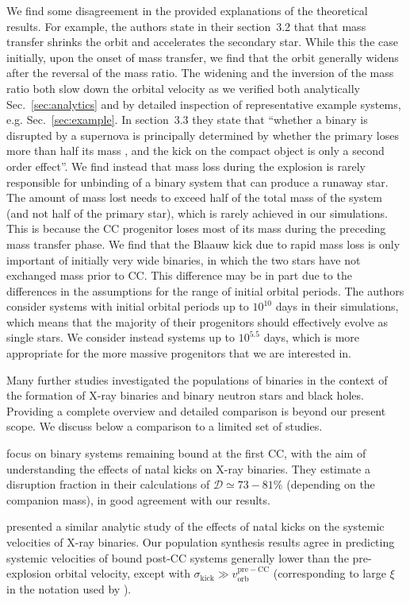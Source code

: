 \documentclass{aa}
\DeclareRobustCommand{\Secref}[1]{Sec.~\ref{#1}}
\begin{document}
We find some disagreement in the provided explanations of the
theoretical results.  For example, the authors state in their
section~3.2 that that mass transfer shrinks the orbit and accelerates
the secondary star. While this the case initially, upon the onset of
mass transfer, we find that the orbit generally widens after the
reversal of the mass ratio. The widening and the inversion of the mass
ratio both slow down the orbital velocity as we verified both
analytically \Secref{sec:analytics} and by detailed inspection of
representative example systems, e.g. \Secref{sec:example}.  In
section~3.3 they state that  ``whether a binary is disrupted by a
supernova is principally determined by whether the primary loses more
than half its mass \citep{blaauw:61}, and the kick on the compact
object is only a second order effect''.  We find instead that mass
loss during the explosion is rarely responsible for unbinding of a
binary system that can produce a runaway star. The amount of mass lost
needs to exceed half of the total mass of the system (and not half of
the primary star), which is rarely achieved in our simulations. This
is because the  CC progenitor loses most of its mass during the
preceding mass transfer phase. We find that the Blaauw kick due to
rapid mass loss is only important of initially very wide binaries, in which the two stars have not exchanged mass prior to CC.  This difference may be in part due to the differences in the assumptions for the range of initial orbital periods. The authors consider systems with initial orbital periods up to  $10^{10}$ days in their simulations, which means that the majority of their progenitors should effectively evolve as single stars. We consider instead systems up to $10^{5.5}$ days, which is more appropriate for the more massive progenitors that we are interested in.  

Many further studies investigated the populations of binaries in the
context of the formation of X-ray binaries and binary neutron stars
and black holes. Providing a complete overview and detailed
comparison is beyond our present scope. We discuss below a comparison
to a limited set of studies.

\cite{brandt:95} focus on binary systems remaining bound at the first CC, with the aim of understanding the
effects of natal kicks on X-ray binaries.  They estimate a disruption
fraction in their calculations of $\mathcal{D}\simeq73-81\%$
(depending on the companion mass), in good agreement with our
results.

\cite{kalogera:96} presented a similar analytic study of the effects of natal kicks on the systemic velocities of X-ray binaries. Our population synthesis results agree in predicting systemic velocities of bound post-CC systems generally lower than the pre-explosion orbital velocity,
except with $\sigma_\mathrm{kick} \gg v_\mathrm{orb}^\mathrm{pre-CC}$ (corresponding to large $\xi$ in the notation used by \citealt{kalogera:96}).
\end{document}
